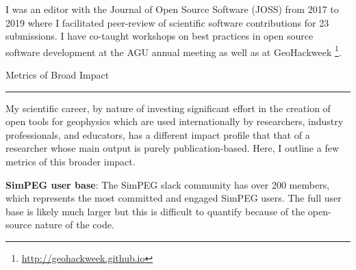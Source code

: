 \documentclass[a4paper, 11pt]{article}
\newcommand{\heading}[1]{
    \begin{minipage}[t]{\textwidth}
    \vspace{0.05cm}
    {\LARGE #1}\\
    \vspace{-0.24cm}
    \hrule
    \end{minipage}
    \vspace{0.05cm}

}
\begin{document}
I was an editor with the Journal of Open Source Software (JOSS) from 2017 to 2019 where I facilitated peer-review of scientific software contributions for 23 submissions. I have co-taught workshops on best practices in open source software development at the AGU annual meeting as well as at GeoHackweek
\footnote{\href{http://geohackweek.github.io}{http://geohackweek.github.io}}.



\heading{Metrics of Broad Impact}

My scientific career, by nature of investing significant effort in the creation of open tools for geophysics which are used internationally by researchers, industry professionals, and educators, has a different impact profile that that of a researcher whose main output is purely publication-based. Here, I outline a few metrics of this broader impact. \vspace{0.3cm}

\textbf{SimPEG user base}: The SimPEG slack community has over 200 members, which represents the most committed and engaged SimPEG users. The full user base is likely much larger but this is difficult to quantify because of the open-source nature of the code. \vspace{0.3cm}

\end{document}
